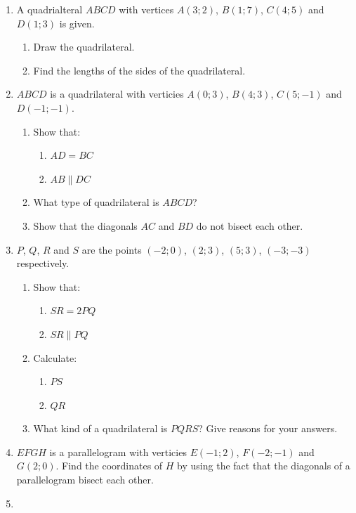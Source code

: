 \begin{eocexercises}{}
\begin{enumerate}[noitemsep, label=\textbf{\arabic*}. ]
\begin{enumerate}[noitemsep, label=\textbf{(\alph*)} ]
\end{enumerate}
\item 
A quadrialteral $ABCD$ with vertices $A(3;2)$, $B(1;7)$, $C(4;5)$ and $D(1;3)$ is given.
 \begin{enumerate}[noitemsep, label=\textbf{(\alph*)} ]
\item  Draw the quadrilateral.
\item  Find the lengths of the sides of the quadrilateral.
\end{enumerate}
\item $ABCD$ is a quadrilateral with verticies $A(0;3)$, $B(4;3)$, $C(5;-1)$ and $D(-1;-1)$.
 \begin{enumerate}[noitemsep, label=\textbf{(\alph*)} ]
\item Show that:
\begin{enumerate}[noitemsep, label=\textbf{\roman*}. ] 
\item $AD = BC$
\item $AB \parallel DC$
\end{enumerate}
\item What type of quadrilateral is $ABCD$?
\item Show that the diagonals $AC$ and $BD$ do not bisect each other.
\end{enumerate}
\item $P$, $Q$, $R$ and $S$ are the points $(-2;0)$, $(2;3)$, $(5;3)$, $(-3;-3)$ respectively.
 \begin{enumerate}[noitemsep, label=\textbf{(\alph*)} ]
\item Show that:
\begin{enumerate}[noitemsep, label=\textbf{\roman*}. ] 
\item $SR = 2PQ$
\item $SR \parallel PQ$
\end{enumerate}
\item Calculate:
\begin{enumerate}[noitemsep, label=\textbf{\roman*}. ] 
\item $PS$
\item $QR$
\end{enumerate}
\item What kind of a quadrilateral is $PQRS$? Give reasons for your answers.
\end{enumerate}
\item $EFGH$ is a parallelogram with verticies $E(-1;2)$, $F(-2;-1)$ and $G(2;0)$. Find the coordinates of $H$ by using the fact that the diagonals of a parallelogram bisect each other.
\item  

\end{enumerate}
\end{eocexercises}
